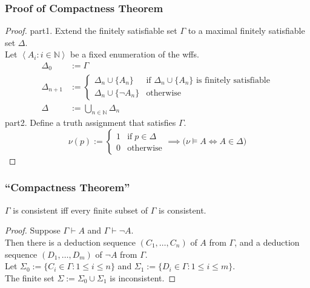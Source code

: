 \documentclass[UTF8,aspectratio=43,11pt,colorlinks,compress,openany]{beamer}%
\begin{document}
\begin{frame}\frametitle{Proof of Compactness Theorem}
	\begin{proof}
		part1. Extend the finitely satisfiable
		set $\Gamma$ to a maximal finitely satisfiable set $\Delta$.\\
		Let $\left\langle A_i: i\in\mathbb{N}\right\rangle$ be a fixed enumeration of the wffs.
		\begin{align*}
		\Delta_0&:=\Gamma\\
		\Delta_{n+1}&:=
		\begin{cases}
		\Delta_n\cup\{A_n\} &\text{if $\Delta_n\cup\{A_n\}$ is finitely satisfiable}\\
		\Delta_n\cup\{\neg A_n\} &\text{otherwise}
		\end{cases}\\
		\Delta&:=\bigcup\limits_{n\in\mathbb{N}}\Delta_n
		\end{align*}
		part2. Define a truth assignment that satisfies $\Gamma$.
		\[\nu(p):=
		\begin{cases}
		1 &\text{if}\; p\in\Delta\\
		0 &\text{otherwise}
		\end{cases}\implies\big(\nu\vDash A\iff A\in\Delta\big)\]
	\end{proof}
\end{frame}

\begin{frame}\frametitle{``Compactness Theorem''}
	\begin{theorem}
		$\Gamma$ is consistent iff every finite subset of $\Gamma$ is consistent.
	\end{theorem}
	\begin{proof}
		Suppose $\Gamma\vdash A$ and $\Gamma\vdash\neg A$.\\
		Then there is a deduction sequence $(C_1,\dots,C_n)$ of $A$ from $\Gamma$, and a deduction sequence $(D_1,\dots,D_m)$ of $\neg A$ from $\Gamma$.\\
		Let $\Sigma_0:=\{C_i\in\Gamma: 1\leq i\leq n\}$ and $\Sigma_1:=\{D_i\in\Gamma: 1\leq i\leq m\}$.\\
		The finite set $\Sigma:=\Sigma_0\cup\Sigma_1$ is inconsistent.
	\end{proof}
\end{frame}
\end{document}
